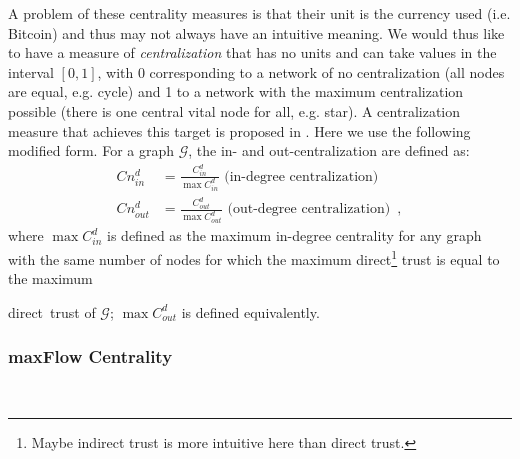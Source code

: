     A problem of these centrality measures is that their unit is the currency used (i.e. Bitcoin) and thus may not always have
    an intuitive meaning. We would thus like to have a measure of \textit{centralization} that has no units and can take
    values in the interval $\left[0,1\right]$, with 0 corresponding to a network of no centralization (all nodes are equal,
    e.g.  cycle) and 1 to a network with the maximum centralization possible (there is one central vital node for all, e.g.
    star). A centralization measure that achieves this target is proposed in \cite{freeman}. Here we use the following
    modified form. For a graph $\mathcal{G}$, the in- and out-centralization are defined as:
    \begin{align*}
      Cn^d_{in} &= \frac{C^d_{in}}{\max C^d_{in}} \mbox{ (in-degree centralization)} \\
      Cn^d_{out} &= \frac{C^d_{out}}{\max C^d_{out}} \mbox{ (out-degree centralization)} \enspace,
    \end{align*}
    where $\max C^d_{in}$ is defined as the maximum in-degree centrality for any graph with the same number of nodes for which
    the maximum direct\footnote{Maybe indirect trust is more intuitive here than direct trust.} trust is equal to the maximum
    \addtocounter{footnote}{-1}direct\footnotemark \ trust of $\mathcal{G}$; $\max C^d_{out}$ is defined equivalently.

  \subsubsection{maxFlow Centrality} \ \\

